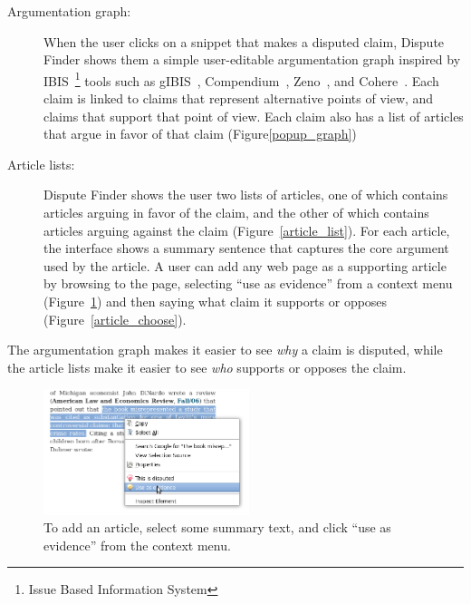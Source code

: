 \documentclass{www2010-submission}
\begin{document}
\begin{description}
\item[Argumentation graph:] When the user clicks on a snippet that makes a disputed claim, Dispute Finder shows them a simple user-editable argumentation graph inspired by IBIS~\footnote{Issue Based Information System} tools such as gIBIS~\cite{Conklin1987a}, Compendium~\cite{Selvin2001}, Zeno~\cite{Gordon1997}, and Cohere~\cite{Shum2008}. Each claim is linked to claims that represent alternative points of view, and claims that support that point of view. Each claim also has a list of articles that argue in favor of that claim (Figure\ref{popup_graph})

\item[Article lists:] Dispute Finder shows the user two lists of articles, one of which contains articles arguing in favor of the claim, and the other of which contains articles arguing against the claim (Figure~\ref{article_list}). For each article, the interface shows a summary sentence that captures the core argument used by the article. A user can add any web page as a supporting article by browsing to the page, selecting ``use as evidence'' from a context menu (Figure~\ref{add_article}) and then saying what claim it supports or opposes (Figure~\ref{article_choose}).
\end{description}

The argumentation graph makes it easier to see {\it why} a claim is disputed, while the article lists make it easier to see {\it who} supports or opposes the claim. 

\begin{figure}[tb]
	\begin{center}
	\includegraphics[width=6cm]{pictures/mark_evidence.png}
	\caption{To add an article, select some summary text, and click ``use as evidence'' from the context menu.}
	\label{add_article}
	\end{center}
\end{figure}
\end{document}
